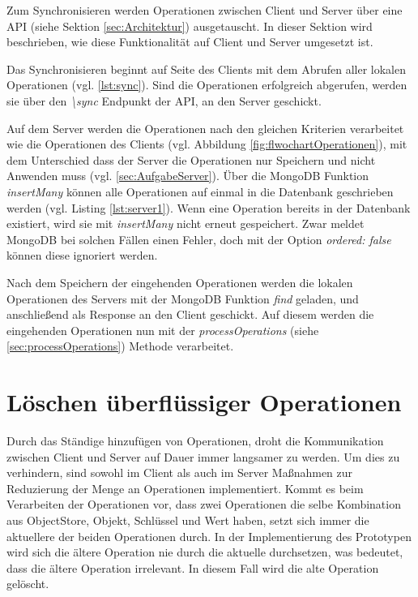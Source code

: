 \documentclass[a4paper, 12pt]{scrreprt}
\begin{document}
Zum Synchronisieren werden Operationen zwischen Client und Server über eine API (siehe Sektion \ref{sec:Architektur}) ausgetauscht. In dieser Sektion wird beschrieben, wie diese Funktionalität auf Client und Server umgesetzt ist.

Das Synchronisieren beginnt auf Seite des Clients mit dem Abrufen aller lokalen Operationen (vgl. \ref{lst:sync}). Sind die Operationen erfolgreich abgerufen, werden sie über den \textit{\textbackslash{}sync} Endpunkt der API, an den Server geschickt. 

\begin{minipage}{\linewidth}
	
\end{minipage}

Auf dem Server werden die Operationen nach den gleichen Kriterien verarbeitet wie die Operationen des Clients (vgl. Abbildung \ref{fig:flwochartOperationen}), mit dem Unterschied dass der Server die Operationen nur Speichern und nicht Anwenden muss (vgl. \ref{sec:AufgabeServer}). Über die MongoDB Funktion \textit{insertMany} können alle Operationen auf einmal in die Datenbank geschrieben werden (vgl. Listing  \ref{lst:server1}). Wenn eine Operation bereits in der Datenbank existiert, wird sie mit \textit{insertMany} nicht erneut gespeichert. Zwar meldet MongoDB bei solchen Fällen einen Fehler, doch mit der Option \textit{ordered: false} können diese ignoriert werden.

Nach dem Speichern der eingehenden Operationen werden die lokalen Operationen des Servers mit der MongoDB Funktion \textit{find} geladen, und anschließend als Response an den Client geschickt. Auf diesem werden die eingehenden Operationen nun mit der \textit{processOperations} (siehe \ref{sec:processOperations}) Methode verarbeitet.

\begin{minipage}{\linewidth}
	
\end{minipage}

\section{Löschen überflüssiger Operationen}

Durch das Ständige hinzufügen von Operationen, droht die Kommunikation zwischen Client und Server auf Dauer immer langsamer zu werden. Um dies zu verhindern, sind sowohl im Client als auch im Server Maßnahmen zur Reduzierung der Menge an Operationen implementiert. Kommt es beim Verarbeiten der Operationen vor, dass zwei Operationen die selbe Kombination aus ObjectStore, Objekt, Schlüssel und Wert haben, setzt sich immer die aktuellere der beiden Operationen durch. In der Implementierung des Prototypen wird sich die ältere Operation nie durch die aktuelle durchsetzen, was bedeutet, dass die ältere Operation irrelevant. In diesem Fall wird die alte Operation gelöscht. 
\end{document}
